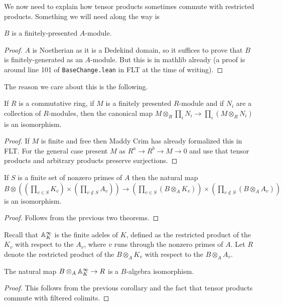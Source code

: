 We now need to explain how tensor products sometimes commute with restricted products.
Something we will need along the way is

\begin{theorem} $B$ is a finitely-presented $A$-module.
  \label{IsDedekindDomain.AKLB.finitePresentation}
\end{theorem}
\begin{proof} $A$ is Noetherian as it is a Dedekind domain, so it suffices to prove that $B$ is
  finitely-generated as an $A$-module. But this is in mathlib already (a proof is
  around line 101 of {\tt BaseChange.lean} in FLT at the time of writing).
\end{proof}

The reason we care about this is the following.

\begin{theorem}
  \label{pi_tensorProduct_of_finitePresentation}
  If $R$ is a commutative ring, if $M$ is a finitely presented $R$-module
  and if $N_i$ are a collection of $R$-modules, then the canonical map
  $M\otimes_R\prod_i N_i\to\prod_i(M\otimes_R N_i)$ is an isomorphism.
\end{theorem}
\begin{proof} If $M$ is finite and free then Maddy Crim has already formalized this
  in FLT. For the general case present $M$ as $R^a\to R^b\to M\to 0$ and use that tensor
  products and arbitrary products preserve surjections.
\end{proof}

\begin{corollary}
  \label{IsDedekindDomain.pi_tensorProduct}
  If $S$ is a finite set of nonzero primes of $A$ then the natural map
  $B\otimes((\prod_{v\in S}K_v)\times(\prod_{v\notin S}A_v))\to
  (\prod_{v\in S}(B\otimes_AK_v))\times(\prod_{v\notin S}(B\otimes_AA_v))$
  is an isomorphism.
\end{corollary}
\begin{proof} Follows from the previous two theorems.
\end{proof}

Recall that $\mathbb{A}_K^\infty$ is the finite adeles of $K$,
defined as the restricted product of the $K_v$ with respect to the $A_v$,
where $v$ runs through the nonzero primes of $A$. Let $R$ denote the restricted
product of the $B\otimes_A K_v$ with respect to the $B\otimes_A A_v$.

\begin{corollary}
  \label{IsDedekindDomain.FiniteAdeleRing.IntegraltensorProductAlgEquiv_aux1}
  The natural map $B\otimes_A\mathbb{A}_K^\infty\to R$ is a $B$-algebra isomorphism.
\end{corollary}
\begin{proof} This follows from the previous corollary and the fact that
  tensor products commute with filtered colimits.
\end{proof}

